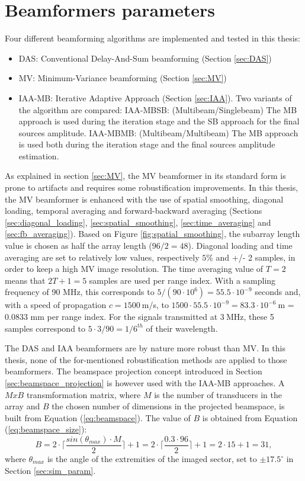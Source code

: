 \section{Beamformers parameters}
\label{sec:beamform_param}
Four different beamforming algorithms are implemented and tested in this thesis:
\begin{itemize}
    \item DAS: Conventional Delay-And-Sum beamforming (Section \ref{sec:DAS})
    \item MV: Minimum-Variance beamforming (Section \ref{sec:MV})
    \item IAA-MB: Iterative Adaptive Approach (Section \ref{sec:IAA}). Two variants of the algorithm are compared:
    \subitem IAA-MBSB: (Multibeam/Singlebeam) The MB approach is used during the iteration stage and the SB approach for the final sources amplitude.
    \subitem IAA-MBMB: (Multibeam/Multibeam) The MB approach is used both during the iteration stage and the final sources amplitude estimation.
\end{itemize}
\noindent
As explained in section \ref{sec:MV}, the MV beamformer in its standard form is prone to artifacts and requires some robustification improvements. In this thesis, the MV beamformer is enhanced with the use of spatial smoothing, diagonal loading, temporal averaging and forward-backward averaging (Sections \ref{sec:diagonal_loading}, \ref{sec:spatial_smoothing}, \ref{sec:time_averaging} and \ref{sec:fb_averaging}).
Based on Figure \ref{fig:spatial_smoothing}, the subarray length value is chosen as half the array length ($96/2 = 48$). Diagonal loading and time averaging are set to relatively low values, respectively $5\%$ and +/- 2 samples, in order to keep a high MV image resolution. The time averaging value of $T=2$ means that $2T+1=5$ samples are used per range index. With a sampling frequency of 90 MHz, this corresponds to $5 / (90 \cdot 10^6) = 55.5 \cdot 10^{-9}$ seconds and, with a speed of propagation $c = 1500~$m/s, to $1500 \cdot 55.5 \cdot 10^{-9} = 83.3 \cdot 10^{-6}~$m = 0.0833 mm per range index.
For the signals transmitted at $3~$MHz, these 5 samples correspond to $5 \cdot 3 / 90 = 1/6^{th}$ of their wavelength.

The DAS and IAA beamformers are by nature more robust than MV. In this thesis, none of the for-mentioned robustification methods are applied to those beamformers. The beamspace projection concept introduced in Section \ref{sec:beamspace_projection} is however used with the IAA-MB approaches. A $M x B$ transmformation matrix, where $M$ is the number of transducers in the array and $B$ the chosen number of dimensions in the projected beamspace, is built from Equation (\ref{eq:beamspace}). The value of $B$ is obtained from Equation (\ref{eq:beamspace_size}):
\begin{equation}
    B = 2 \cdot \lceil \frac{sin(\theta_{max}) \cdot M}{2} \rceil + 1 = 2 \cdot \lceil \frac{0.3 \cdot 96}{2} \rceil + 1 = 2 \cdot 15 + 1 = 31,
\end{equation}
\noindent
where $\theta_{max}$ is the angle of the extremities of the imaged sector, set to $\pm 17.5^\circ$ in Section \ref{sec:sim_param}.

